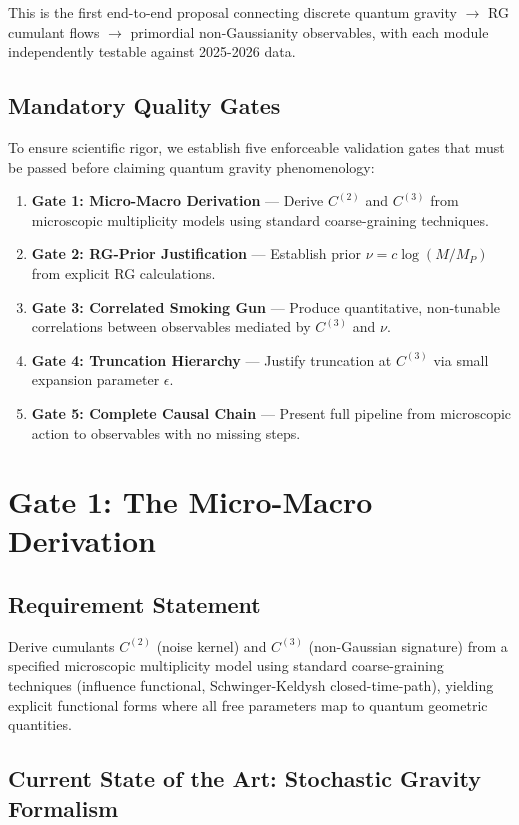 \documentclass[12pt,a4paper]{article}
\begin{document}
This is the first end-to-end proposal connecting discrete quantum gravity \(\rightarrow\) RG cumulant flows \(\rightarrow\) primordial non-Gaussianity observables, with each module independently testable against 2025-2026 data.

\subsection{Mandatory Quality Gates}

To ensure scientific rigor, we establish five enforceable validation gates that must be passed before claiming quantum gravity phenomenology:

\begin{enumerate}
\item \textbf{Gate 1: Micro-Macro Derivation} — Derive \(C^{(2)}\) and \(C^{(3)}\) from microscopic multiplicity models using standard coarse-graining techniques.
\item \textbf{Gate 2: RG-Prior Justification} — Establish prior \(\nu = c\log(M/M_P)\) from explicit RG calculations.
\item \textbf{Gate 3: Correlated Smoking Gun} — Produce quantitative, non-tunable correlations between observables mediated by \(C^{(3)}\) and \(\nu\).
\item \textbf{Gate 4: Truncation Hierarchy} — Justify truncation at \(C^{(3)}\) via small expansion parameter \(\epsilon\).
\item \textbf{Gate 5: Complete Causal Chain} — Present full pipeline from microscopic action to observables with no missing steps.
\end{enumerate}

\section{Gate 1: The Micro-Macro Derivation}

\subsection{Requirement Statement}

Derive cumulants \(C^{(2)}\) (noise kernel) and \(C^{(3)}\) (non-Gaussian signature) from a specified microscopic multiplicity model using standard coarse-graining techniques (influence functional, Schwinger-Keldysh closed-time-path), yielding explicit functional forms where all free parameters map to quantum geometric quantities.

\subsection{Current State of the Art: Stochastic Gravity Formalism}
\end{document}
